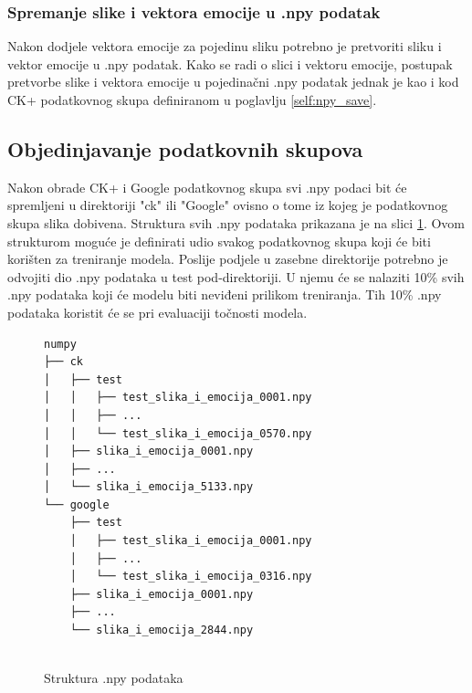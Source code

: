\documentclass[times, utf8, zavrsni,numeric,pstricks]{fer}
\begin{document}
\subsubsection{Spremanje slike i vektora emocije u .npy podatak}
Nakon dodjele vektora emocije za pojedinu sliku potrebno je pretvoriti sliku i vektor emocije u .npy podatak. Kako se radi o slici i vektoru emocije, postupak pretvorbe slike i vektora emocije u pojedinačni .npy podatak jednak je kao i kod CK+ podatkovnog skupa definiranom u poglavlju \ref{self:npy_save}.


\subsection{Objedinjavanje podatkovnih skupova}
Nakon obrade CK+ i Google podatkovnog skupa svi .npy podaci bit će spremljeni u direktoriji "ck" ili "Google" ovisno o tome iz kojeg je podatkovnog skupa slika dobivena. Struktura svih .npy podataka prikazana je na slici \ref{pic:npy_structure}. Ovom strukturom moguće je definirati udio svakog podatkovnog skupa koji će biti korišten za treniranje modela. Poslije podjele u zasebne direktorije potrebno je odvojiti dio .npy podataka u test pod-direktoriji. U njemu će se nalaziti 10\% svih .npy podataka koji će modelu biti neviđeni prilikom treniranja. Tih 10\% .npy podataka koristit će se pri evaluaciji točnosti modela.


\begin{figure}[H]
\centering
\begin{Verbatim}[fontsize=\small]
numpy
├── ck
│   ├── test
│   │	├── test_slika_i_emocija_0001.npy
│   │	├── ...
│   │	└── test_slika_i_emocija_0570.npy
│   ├── slika_i_emocija_0001.npy
│   ├── ...
│   └── slika_i_emocija_5133.npy
└── google
    ├── test
    │	├── test_slika_i_emocija_0001.npy
	│	├── ...
	│	└── test_slika_i_emocija_0316.npy
    ├── slika_i_emocija_0001.npy
    ├── ...
    └── slika_i_emocija_2844.npy
    

\end{Verbatim}
\caption{Struktura .npy podataka}
\label{pic:npy_structure}
\end{figure}
\end{document}
